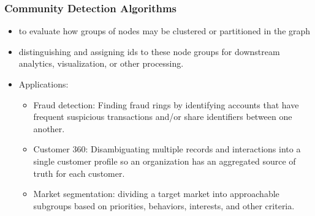 \begin{frame}[fragile]\frametitle{Community Detection Algorithms}

 
 \begin{itemize}
\item to evaluate how groups of nodes may be clustered or partitioned in the graph
\item distinguishing and assigning ids to these node groups for downstream analytics, visualization, or other processing.
\item Applications:
	\begin{itemize}
	\item Fraud detection: Finding fraud rings by identifying accounts that have frequent suspicious transactions and/or share identifiers between one another.
	\item Customer 360: Disambiguating multiple records and interactions into a single customer profile so an organization has an aggregated source of truth for each customer.
	\item Market segmentation: dividing a target market into approachable subgroups based on priorities, behaviors, interests, and other criteria.
	\end{itemize}
\end{itemize}



\end{frame}

